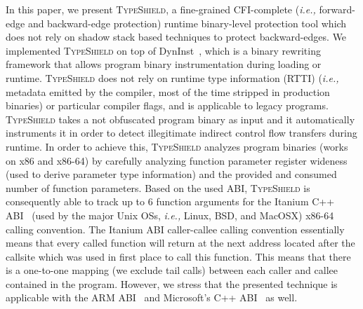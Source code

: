 In this paper, we present \textsc{TypeShield}, a fine-grained CFI-complete (\textit{i.e.,} forward-edge and backward-edge protection) runtime 
binary-level protection tool which does not rely on shadow stack based techniques to protect backward-edges. 
We implemented \textsc{TypeShield} on top of DynInst~\cite{bernat:dyninst}, which is
a binary rewriting framework that allows program binary instrumentation during loading or runtime.
\textsc{TypeShield} does not rely on runtime type information (RTTI) (\textit{i.e.,} metadata emitted by the compiler, most of the time stripped in production binaries) or particular compiler flags, and is applicable to legacy programs.
\textsc{TypeShield} takes a not obfuscated program binary as input and it automatically instruments it in order to detect illegitimate indirect control flow transfers during runtime. 
In order to achieve this, \textsc{TypeShield} analyzes program binaries (works on x86 and x86-64) by carefully analyzing function parameter register 
wideness (used to derive parameter type information) and the provided and consumed number of function parameters. 
Based on the used ABI, \textsc{TypeShield} is consequently able to track up to 6 function arguments for the Itanium C++ ABI~\cite{itanium:abi} (used by the major Unix OSs, \textit{i.e.,} Linux, BSD, and MacOSX) x86-64 calling convention. 
The Itanium ABI caller-callee calling convention essentially means that every called function will return at the next address located after the callsite which was 
used in first place to call this function. This means that there is a one-to-one mapping (we exclude tail calls) between each caller and callee contained in the program.
However, we stress that the presented technique is applicable with the ARM ABI~\cite{arm:abi} and Microsoft's C++ ABI~\cite{microsoft:abi} 
as well.

